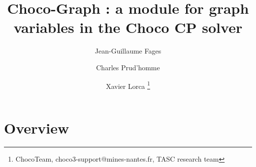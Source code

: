 \documentclass{article}
\begin{document}
\author{Jean-Guillaume Fages \and Charles Prud'homme \and Xavier Lorca \thanks{ChocoTeam, choco3-support@mines-nantes.fr, TASC research team}}                       
\title{Choco-Graph : a module for graph variables in the Choco CP solver}
\maketitle
%

{\scriptsize\tableofcontents{}}
\newpage{}

\newcommand{\GV}{\ensuremath{\mathcal{G}}}
\newcommand{\GLB}{\ensuremath{\underline{\mathcal{G}}}}
\newcommand{\GUB}{\ensuremath{\overline{\mathcal{G}}}}

\section{Overview}
\end{document}
